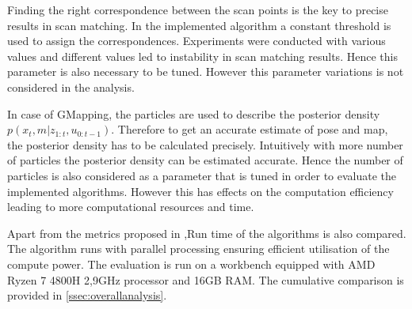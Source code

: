 \par
Finding the right correspondence between the scan points is the key to precise results in scan matching. In the implemented algorithm a constant threshold is used to assign the correspondences. Experiments were conducted with various values and different values led to instability in scan matching results. Hence this parameter is also necessary to be tuned. However this parameter variations is not considered in the analysis.
\par
In case of GMapping, the particles are used to describe the posterior density $p(x_t, m | z_{1:t}, u_{0:t-1})$. Therefore to get an accurate estimate of pose and map, the posterior density has to be calculated precisely. Intuitively with more number of particles the posterior density can be estimated accurate. Hence the number of particles is also considered as a parameter that is tuned in order to evaluate the implemented algorithms. However this has effects on the computation efficiency leading to more computational resources and time.
\par
Apart from the metrics proposed in \cite{kuemmerle09auro},Run time of the algorithms is also compared. The algorithm runs with parallel processing ensuring efficient utilisation of the compute power. The evaluation is run on a workbench equipped with AMD Ryzen 7 4800H 2,9GHz processor and 16GB RAM. The cumulative comparison is provided in \ref{ssec:overallanalysis}.

